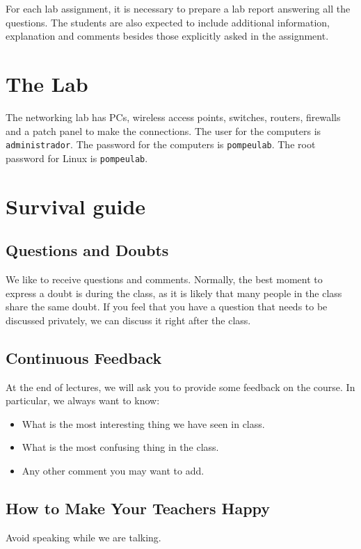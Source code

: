 For each lab assignment, it is necessary to prepare a lab report answering all the questions. The students are also expected to include additional information, explanation and comments besides those explicitly asked in the assignment.

\section{The Lab}
The networking lab has PCs, wireless access points, switches, routers, firewalls and a patch panel to make the connections.
The user for the computers is \texttt{\color{blue}administrador}.
The password for the computers is \texttt{\color{blue}pompeulab}.
The root password for Linux is \texttt{\color{blue}pompeulab}.

\section{Survival guide}

\subsection{Questions and Doubts}

We like to receive questions and comments. Normally, the best moment to express a doubt is during the class, as it is likely that many people in the class share the same doubt. If you feel that you have a question that needs to be discussed privately, we can discuss it right after the class.

\subsection{Continuous Feedback}

At the end of lectures, we will ask you to provide some feedback on the course. In particular, we always want to know:
\begin{itemize}
\item What is the most interesting thing we have seen in class.
\item What is the most confusing thing in the class.
\item Any other comment you may want to add.

\end{itemize}

\subsection{How to Make Your Teachers Happy}

Avoid speaking while we are talking.
